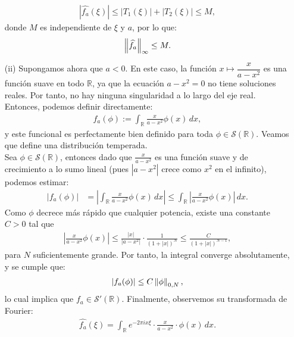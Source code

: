 \begin{homeworkProblem}
\begin{solution}
\begin{itemize}
\begin{align*}
          |\hat{f_a}(\xi)| \leq |T_1(\xi)| + |T_2(\xi)| \leq M,
        \end{align*}
        donde $M$ es independiente de $\xi$ y $a$, por lo que:
        \begin{align*}
          \left\|\widehat{f_a}\right\|_{\infty} \leq M.
        \end{align*}
      \item[(ii)] Supongamos ahora que $a < 0$. En este caso, la función $x \mapsto \dfrac{x}{a - x^2}$ es una función suave en todo $\mathbb{R}$, ya que la ecuación $a - x^2 = 0$ no tiene soluciones reales. Por tanto, no hay ninguna singularidad a lo largo del eje real.\\
      Entonces, podemos definir directamente:
      \begin{align*}
        f_a(\phi) := \int_{\mathbb{R}} \frac{x}{a - x^2} \phi(x) \, dx,
      \end{align*}
      y este funcional es perfectamente bien definido para toda $\phi \in \mathcal{S}(\mathbb{R})$. Veamos que define una distribución temperada.\\
      Sea $\phi \in \mathcal{S}(\mathbb{R})$, entonces dado que $\frac{x}{a - x^2}$ es una función suave y de crecimiento a lo sumo lineal (pues \(|a - x^2|\) crece como \(x^2\) en el infinito), podemos estimar:
      \begin{align*}
        \left| f_a(\phi) \right| &= \left| \int_{\mathbb{R}} \frac{x}{a - x^2} \phi(x) \, dx \right| \leq \int_{\mathbb{R}} \left| \frac{x}{a - x^2} \phi(x) \right| \, dx.
      \end{align*}
      Como $\phi$ decrece más rápido que cualquier potencia, existe una constante $C>0$ tal que
      \begin{align*}
        \left| \frac{x}{a - x^2} \phi(x) \right| \leq \frac{|x|}{|a - x^2|} \cdot \frac{1}{(1 + |x|)^N} \leq \frac{C}{(1 + |x|)^{N-1}},
      \end{align*}
      para \(N\) suficientemente grande. Por tanto, la integral converge absolutamente, y se cumple que:
      \begin{align*}
        |f_a(\phi)| \leq C \left\|\phi\right\|_{0,N},
      \end{align*}
      lo cual implica que \(f_a \in \mathcal{S}'(\mathbb{R})\).
      Finalmente, observemos su transformada de Fourier:
      \begin{align*}
        \hat{f_a}(\xi) = \int_{\mathbb{R}} e^{-2\pi i x \xi} \cdot \frac{x}{a - x^2} \cdot \phi(x) \, dx.
      \end{align*}

\end{itemize}
\end{solution}
\end{homeworkProblem}

